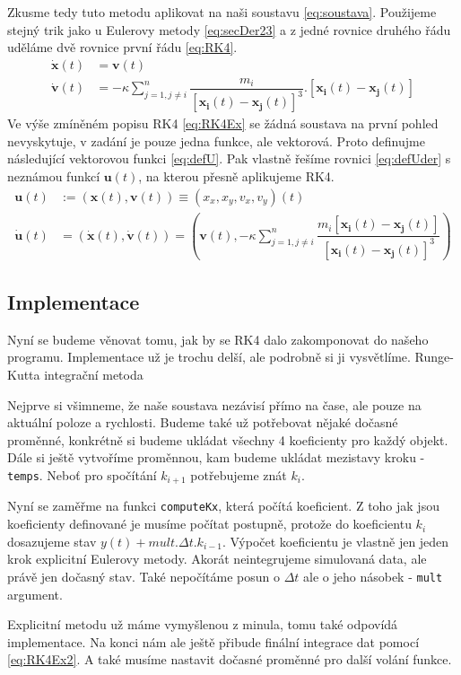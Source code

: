 Zkusme tedy tuto metodu aplikovat na naši soustavu \eqref{eq:soustava}. Použijeme stejný trik jako u Eulerovy metody \eqref{eq:secDer23} a z jedné rovnice druhého řádu uděláme dvě rovnice první řádu \eqref{eq:RK4}.
\begin{subequations}
	\label{eq:RK4}
	\begin{align}
	\label{eq:RK4pos}
	\dot{\boldsymbol{x}}(t)&=\boldsymbol{v}(t)\\
	\label{eq:RK4vel}
	\dot{\boldsymbol{v}}(t)&=-  \kappa \sum_{j=1,j \neq i}^{n}\dfrac{m_i}
	{\left[ \boldsymbol{x_i}(t) - \boldsymbol{x_j}(t)\right] ^3} . 
	\left[ \boldsymbol{x_i}(t) - \boldsymbol{x_j}(t)\right] 
	\end{align}
\end{subequations}
Ve výše zmíněném popisu RK4 \eqref{eq:RK4Ex} se žádná soustava na první pohled nevyskytuje, v zadání je pouze jedna funkce, ale vektorová. Proto definujme následující vektorovou funkci \eqref{eq:defU}. Pak vlastně řešíme rovnici \eqref{eq:defUder} s neznámou funkcí $ \boldsymbol{u}(t) $, na kterou přesně aplikujeme RK4.
\begin{align}
	\label{eq:defU}
	\boldsymbol{u}(t) &:= (\boldsymbol{x}(t),\boldsymbol{v}(t)) \equiv(x_x,x_y,v_x,v_y)(t)\\
	\label{eq:defUder}
	 \boldsymbol{\dot{u}}(t)&=(\dot{\boldsymbol{x}}(t),\dot{\boldsymbol{v}}(t))=
	 (\boldsymbol{v}(t), -\kappa \sum_{j=1,j \neq i}^{n}\dfrac{m_i\left[ \boldsymbol{x_i}(t) - \boldsymbol{x_j}(t)\right]}
	 {\left[ \boldsymbol{x_i}(t) - \boldsymbol{x_j}(t)\right] ^3}
	  )
\end{align}


\subsection{Implementace}
Nyní se budeme věnovat tomu, jak by se RK4 dalo zakomponovat do našeho programu.
Implementace už je trochu delší, ale podrobně si ji vysvětlíme.
{Runge-Kutta integrační metoda}

Nejprve si všimneme, že naše soustava nezávisí přímo na čase, ale pouze na aktuální poloze a rychlosti. Budeme také už potřebovat nějaké dočasné proměnné, konkrétně si budeme ukládat všechny 4 koeficienty pro každý objekt. Dále si ještě vytvoříme proměnnou, kam budeme ukládat mezistavy kroku - \texttt{temps}. Neboť pro spočítání $ k_{i+1} $ potřebujeme znát $ k_{i} $.

Nyní se zaměřme na funkci \texttt{computeKx}, která počítá koeficient. Z toho jak jsou koeficienty definované je musíme počítat postupně, protože do koeficientu $ k_i  $ dosazujeme stav $ y(t)+mult. \Delta t . k_{i-1} $.
Výpočet koeficientu je vlastně jen jeden krok explicitní Eulerovy metody. Akorát neintegrujeme simulovaná data, ale právě jen dočasný stav. Také nepočítáme posun o $ \Delta t $ ale o jeho násobek - \texttt{mult} argument.

Explicitní metodu už máme vymyšlenou z minula, tomu také odpovídá implementace.
Na konci nám ale ještě přibude finální integrace dat pomocí \eqref{eq:RK4Ex2}.
A také musíme nastavit dočasné proměnné pro další volání funkce.